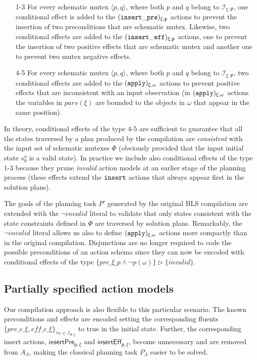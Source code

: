 \documentclass[letterpaper]{article} %
\newcommand{\tup}[1]{{\langle #1 \rangle}}
\begin{document}
\begin{enumerate}
	\item[1-3] For every schematic mutex $\tup{p,q}$, where both $p$ and $q$ belong to ${\mathcal I}_{\xi,\Psi}$, one conditional effect is added to the ${\tt \small (insert\_pre)_{\xi,p}}$ actions to prevent the insertion of two preconditions that are schematic mutex. Likewise, two conditional effects are added to the ${\tt \small (insert\_eff)_{\xi,p}}$ actions, one to prevent the insertion of two positive effects that are schematic mutex and another one to prevent two mutex negative effects.
	\item[4-5] For every schematic mutex $\tup{p,q}$, where both $p$ and $q$ belong to ${\mathcal I}_{\xi,\Psi}$, two conditional effects are added to the ${\tt \small (apply)_{\xi,\omega}}$ actions to prevent positive effects that are inconsistent with an input observation (in ${\tt \small (apply)_{\xi,\omega}}$ actions the variables in $pars(\xi)$ are bounded to the objects in $\omega$ that appear in the same position).
\end{enumerate}

In theory, conditional effects of the type $4$-$5$ are sufficient to guarantee that all the states traversed by a plan produced by the compilation are {\em consistent} with the input set of schematic mutexes $\Phi$ (obviously provided that the input initial state $s_0^o$ is a valid state). In practice we include also conditional effects of the type $1$-$3$ because they prune {\em invalid} action models at an earlier stage of the planning process (these effects extend the ${\tt \small insert}$ actions that always appear first in the solution plans).

The goals of the planning task $P'$ generated by the original BLS compilation are extended with the $\neg invalid$ literal to validate that only states consistent with the state constraints defined in $\Phi$ are traversed by solution plans. Remarkably, the $\neg invalid$ literal allows us also to define ${\tt \small (apply)_{\xi,\omega}}$ actions more compactly than in the original compilation. Disjunctions are no longer required to code the possible preconditions of an action schema since they can now be encoded with conditional effects of the type $\{pre\_\xi\_p\wedge \neg p(\omega)\}\rhd\{invalid\}$.






\subsection{Partially specified action models}
Our compilation approach is also flexible to this particular scenario. The known preconditions and effects are encoded setting the corresponding fluents $\{pre\_e\_\xi, eff\_e\_\xi\}_{\forall e\in{\mathcal I}_{\Psi,\xi}}$ to true in the initial state. Further, the corresponding insert actions, $\mathsf{insertPre_{p,\xi}}$ and $\mathsf{insertEff_{p,\xi}}$, become unnecessary and are removed from $A_{\Lambda}$, making the classical planning task $P_{\Lambda}$ easier to be solved.
\end{document}
